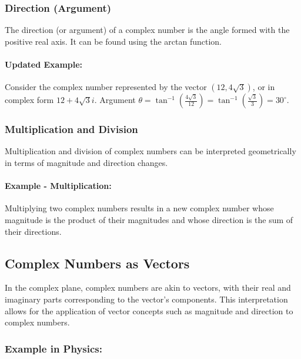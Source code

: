 \documentclass[
]{article}
\begin{document}
\subsubsection{Direction (Argument)}\label{direction-argument}

The direction (or argument) of a complex number is the angle formed with
the positive real axis. It can be found using the arctan function.

\paragraph{Updated Example:}\label{updated-example}

Consider the complex number represented by the vector
\((12, 4\sqrt{3})\), or in complex form \(12 + 4\sqrt{3}i\). Argument
\(\theta = \tan^{-1}\left(\frac{4\sqrt{3}}{12}\right) = \tan^{-1}\left(\frac{\sqrt{3}}{3}\right) = 30^\circ\).

\subsubsection{Multiplication and
Division}\label{multiplication-and-division}

Multiplication and division of complex numbers can be interpreted
geometrically in terms of magnitude and direction changes.

\paragraph{Example - Multiplication:}\label{example---multiplication}

Multiplying two complex numbers results in a new complex number whose
magnitude is the product of their magnitudes and whose direction is the
sum of their directions.

\subsection{Complex Numbers as
Vectors}\label{complex-numbers-as-vectors}

In the complex plane, complex numbers are akin to vectors, with their
real and imaginary parts corresponding to the vector's components. This
interpretation allows for the application of vector concepts such as
magnitude and direction to complex numbers.

\subsubsection{Example in Physics:}\label{example-in-physics}
\end{document}
